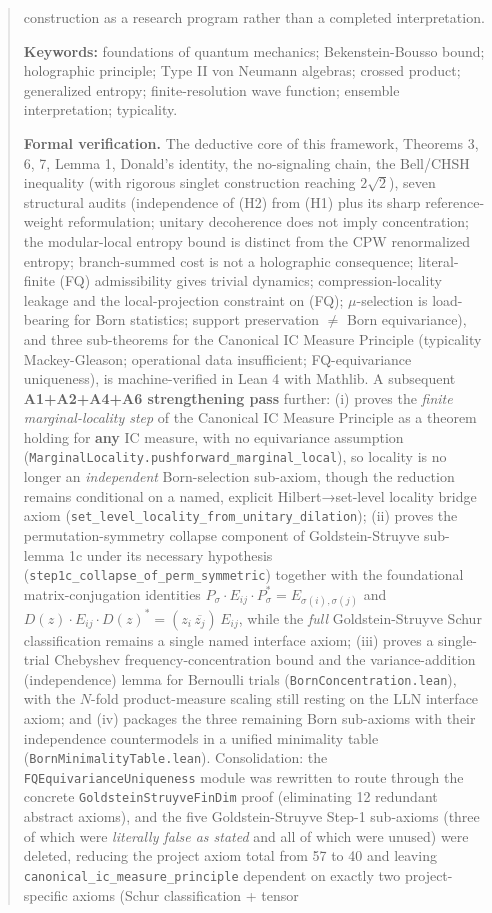 \documentclass[11pt,a4paper]{article}
\begin{document}
\begin{abstract}
construction as a research program rather than a completed interpretation.


\medskip
\noindent\textbf{Keywords:} foundations of quantum mechanics; Bekenstein-Bousso bound; holographic principle; Type II von Neumann algebras; crossed product; generalized entropy; finite-resolution wave function; ensemble interpretation; typicality.

\textbf{Formal verification.} The deductive core of this framework, Theorems 3, 6, 7, Lemma 1, Donald's identity, the no-signaling chain, the Bell/CHSH inequality (with rigorous singlet construction reaching $2\sqrt{2}$), seven structural audits (independence of (H2) from (H1) plus its sharp reference-weight reformulation; unitary decoherence does not imply concentration; the modular-local entropy bound is distinct from the CPW renormalized entropy; branch-summed cost is not a holographic consequence; literal-finite (FQ) admissibility gives trivial dynamics; compression-locality leakage and the local-projection constraint on (FQ); $\mu$-selection is load-bearing for Born statistics; support preservation $\neq$ Born equivariance), and three sub-theorems for the Canonical IC Measure Principle (typicality Mackey-Gleason; operational data insufficient; FQ-equivariance uniqueness), is machine-verified in Lean 4 with Mathlib. A subsequent \textbf{A1+A2+A4+A6 strengthening pass} further: (i) proves the \emph{finite marginal-locality step} of the Canonical IC Measure Principle as a theorem holding for \textbf{any} IC measure, with no equivariance assumption (\texttt{MarginalLocality.pushforward\_marginal\_local}), so locality is no longer an \emph{independent} Born-selection sub-axiom, though the reduction remains conditional on a named, explicit Hilbert→set-level locality bridge axiom (\texttt{set\_level\_locality\_from\_unitary\_dilation}); (ii) proves the permutation-symmetry collapse component of Goldstein-Struyve sub-lemma 1c under its necessary hypothesis (\texttt{step1c\_collapse\_of\_perm\_symmetric}) together with the foundational matrix-conjugation identities $P_\sigma \cdot E_{ij} \cdot P_\sigma^* = E_{\sigma(i),\sigma(j)}$ and $D(z)\cdot E_{ij}\cdot D(z)^* = (z_i\,\overline{z_j})\,E_{ij}$, while the \emph{full} Goldstein-Struyve Schur classification remains a single named interface axiom; (iii) proves a single-trial Chebyshev frequency-concentration bound and the variance-addition (independence) lemma for Bernoulli trials (\texttt{BornConcentration.lean}), with the $N$-fold product-measure scaling still resting on the LLN interface axiom; and (iv) packages the three remaining Born sub-axioms with their independence countermodels in a unified minimality table (\texttt{BornMinimalityTable.lean}). Consolidation: the \texttt{FQEquivarianceUniqueness} module was rewritten to route through the concrete \texttt{GoldsteinStruyveFinDim} proof (eliminating 12 redundant abstract axioms), and the five Goldstein-Struyve Step-1 sub-axioms (three of which were \emph{literally false as stated} and all of which were unused) were deleted, reducing the project axiom total from 57 to 40 and leaving \texttt{canonical\_ic\_measure\_principle} dependent on exactly two project-specific axioms (Schur classification + tensor 
\end{abstract}
\end{document}
